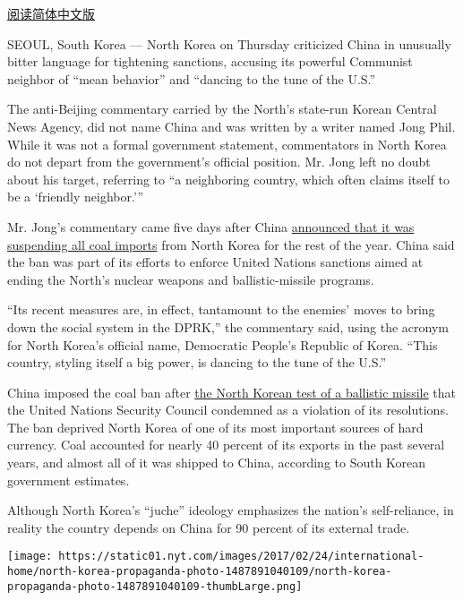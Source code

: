 \href{http://cn.nytimes.com/asia-pacific/20170224/north-korea-china/}{阅读简体中文版}

SEOUL, South Korea --- North Korea on Thursday criticized China in
unusually bitter language for tightening sanctions, accusing its
powerful Communist neighbor of ``mean behavior'' and ``dancing to the
tune of the U.S.''

The anti-Beijing commentary carried by the North's state-run Korean
Central News Agency, did not name China and was written by a writer
named Jong Phil. While it was not a formal government statement,
commentators in North Korea do not depart from the government's official
position. Mr. Jong left no doubt about his target, referring to ``a
neighboring country, which often claims itself to be a `friendly
neighbor.'''

Mr. Jong's commentary came five days after China
\href{https://www.nytimes.com/2017/02/18/world/asia/north-korea-china-coal-imports-suspended.html}{announced
that it was suspending all coal imports} from North Korea for the rest
of the year. China said the ban was part of its efforts to enforce
United Nations sanctions aimed at ending the North's nuclear weapons and
ballistic-missile programs.

``Its recent measures are, in effect, tantamount to the enemies' moves
to bring down the social system in the DPRK,'' the commentary said,
using the acronym for North Korea's official name, Democratic People's
Republic of Korea. ``This country, styling itself a big power, is
dancing to the tune of the U.S.''

China imposed the coal ban after
\href{https://www.nytimes.com/2017/02/11/world/asia/north-korea-missile-test-trump.html}{the
North Korean test of a ballistic missile} that the United Nations
Security Council condemned as a violation of its resolutions. The ban
deprived North Korea of one of its most important sources of hard
currency. Coal accounted for nearly 40 percent of its exports in the
past several years, and almost all of it was shipped to China, according
to South Korean government estimates.

Although North Korea's ``juche'' ideology emphasizes the nation's
self-reliance, in reality the country depends on China for 90 percent of
its external trade.

\href{https://www.nytimes.com/interactive/2017/02/24/world/asia/north-korea-propaganda-photo.html}{}

\texttt{[image: https://static01.nyt.com/images/2017/02/24/international-home/north-korea-propaganda-photo-1487891040109/north-korea-propaganda-photo-1487891040109-thumbLarge.png]}

